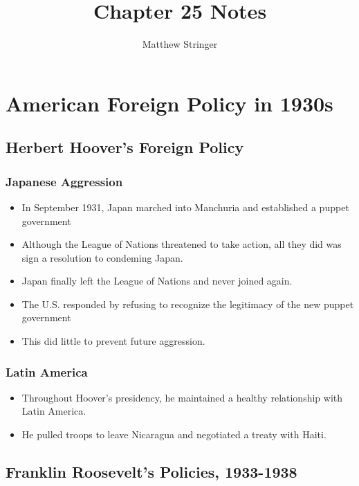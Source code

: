 \documentclass[12pt]{article} %
\title{Chapter 25 Notes} %
\author{Matthew Stringer} %
\begin{document}
	\maketitle
	\tableofcontents
	\newpage

	\section{American Foreign Policy in 1930s}

	\subsection{Herbert Hoover's Foreign Policy}

	\subsubsection{Japanese Aggression}
	\begin{itemize}
		\item In September 1931, Japan marched into Manchuria and established a puppet government
		\item Although the League of Nations threatened to take action, all they did was sign a
			resolution to condeming Japan. 
		\item Japan finally left the League of Nations and never joined again.
		\item The U.S. responded by refusing to recognize the legitimacy of the new puppet government
		\item This did little to prevent future aggression.
	\end{itemize}

	\subsubsection{Latin America}
	\begin{itemize}
		\item Throughout Hoover's presidency, he maintained a healthy relationship with Latin America.
		\item He pulled troops to leave Nicaragua and negotiated a treaty with Haiti.
	\end{itemize}

	\subsection{Franklin Roosevelt's Policies, 1933-1938}
\end{document}
